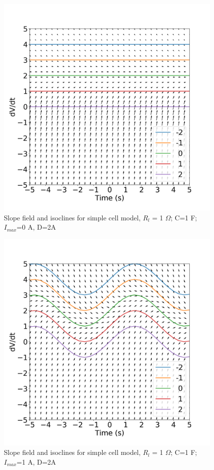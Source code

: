 \documentclass{scrartcl}			%
\begin{document}
\begin{figure}[h]					%
	\centering
	\includegraphics[scale=0.36]{2_2.png}
	\captionsetup{width=\linewidth}  %
	\caption{Slope field and isoclines for simple cell model, $R_{l}$ = 1 $\Omega$; C=1 F; $I_{max}$=0 A, D=2A}
	\label{subsec_fig2_2} %
\end{figure}

\begin{figure}[h]					%
	\centering
	\includegraphics[scale=0.36]{2_3.png}
	\captionsetup{width=\linewidth}  %
	\caption{Slope field and isoclines for simple cell model, $R_{l}$ = 1 $\Omega$; C=1 F; $I_{max}$=1 A, D=2A}
	\label{subsec_fig2_3} %
\end{figure}
\end{document}
